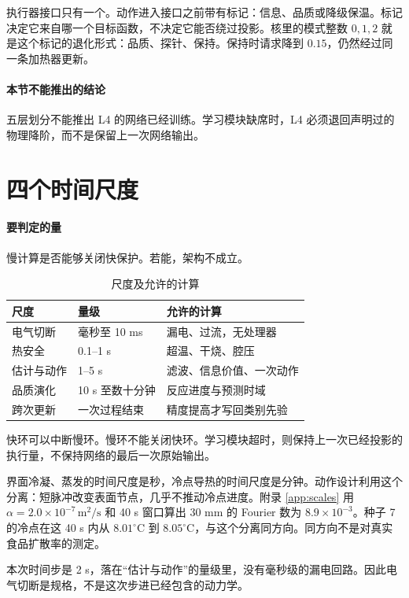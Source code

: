 执行器接口只有一个。动作进入接口之前带有标记：信息、品质或降级保温。标记决定它来自哪一个目标函数，不决定它能否绕过投影。核里的模式整数 \(0,1,2\) 就是这个标记的退化形式：品质、探针、保持。保持时请求降到 \(0.15\)，仍然经过同一条加热器更新。

\paragraph{本节不能推出的结论}
五层划分不能推出 L4 的网络已经训练。学习模块缺席时，L4 必须退回声明过的物理降阶，而不是保留上一次网络输出。

\section{四个时间尺度}

\paragraph{要判定的量}
慢计算是否能够关闭快保护。若能，架构不成立。

\begin{table}[ht]
\centering
\caption{尺度及允许的计算}
\begin{tabularx}{\textwidth}{llX}
\toprule
尺度 & 量级 & 允许的计算 \\
\midrule
电气切断 & 毫秒至 10 ms & 漏电、过流，无处理器 \\
热安全 & 0.1--1 s & 超温、干烧、腔压 \\
估计与动作 & 1--5 s & 滤波、信息价值、一次动作 \\
品质演化 & 10 s 至数十分钟 & 反应进度与预测时域 \\
跨次更新 & 一次过程结束 & 精度提高才写回类别先验 \\
\bottomrule
\end{tabularx}
\end{table}

快环可以中断慢环。慢环不能关闭快环。学习模块超时，则保持上一次已经投影的执行量，不保持网络的最后一次原始输出。

界面冷凝、蒸发的时间尺度是秒，冷点导热的时间尺度是分钟。动作设计利用这个分离：短脉冲改变表面节点，几乎不推动冷点进度。附录 \ref{app:scales} 用 \(\alpha=2.0\times 10^{-7}\,\mathrm{m}^2/\mathrm{s}\) 和 40 s 窗口算出 30 mm 的 Fourier 数为 \(8.9\times 10^{-3}\)。种子 7 的冷点在这 40 s 内从 \(8.01^\circ\mathrm{C}\) 到 \(8.05^\circ\mathrm{C}\)，与这个分离同方向。同方向不是对真实食品扩散率的测定。

本次时间步是 2 s，落在“估计与动作”的量级里，没有毫秒级的漏电回路。因此电气切断是规格，不是这次步进已经包含的动力学。

